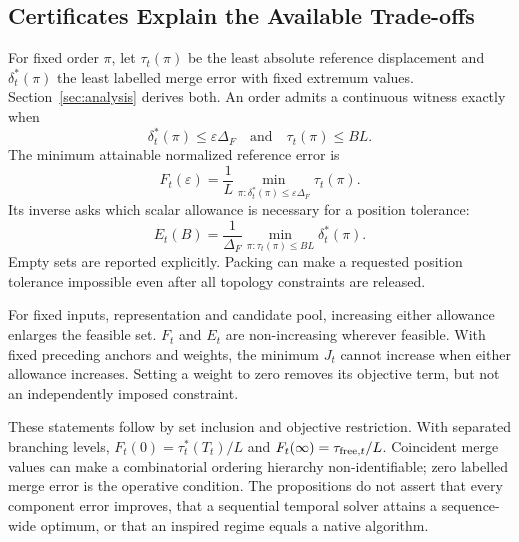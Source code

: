 \subsection{Certificates Explain the Available Trade-offs}
For fixed order $\pi$, let $\tau_t(\pi)$ be the least absolute reference displacement and $\delta_t^*(\pi)$ the least labelled merge error with fixed extremum values. Section~\ref{sec:analysis} derives both. An order admits a continuous witness exactly when
\[
 \delta_t^*(\pi)\le\varepsilon\Delta_F\quad\text{and}\quad\tau_t(\pi)\le BL.
\]
The minimum attainable normalized reference error is
\begin{equation}
 F_t(\varepsilon)=\frac1L\min_{\pi:\delta_t^*(\pi)\le\varepsilon\Delta_F}\tau_t(\pi).
 \label{eq:budget_frontier}
\end{equation}
Its inverse asks which scalar allowance is necessary for a position tolerance:
\begin{equation}
 E_t(B)=\frac1{\Delta_F}\min_{\pi:\tau_t(\pi)\le BL}\delta_t^*(\pi).
 \label{eq:inverse_budget}
\end{equation}
Empty sets are reported explicitly. Packing can make a requested position tolerance impossible even after all topology constraints are released.

\begin{proposition}
For fixed inputs, representation and candidate pool, increasing either allowance enlarges the feasible set. $F_t$ and $E_t$ are non-increasing wherever feasible. With fixed preceding anchors and weights, the minimum $J_t$ cannot increase when either allowance increases. Setting a weight to zero removes its objective term, but not an independently imposed constraint.
\end{proposition}
\noindent These statements follow by set inclusion and objective restriction. With separated branching levels, $F_t(0)=\tau_t^*(T_t)/L$ and $F_t(\infty)=\tau_{\mathrm{free},t}/L$. Coincident merge values can make a combinatorial ordering hierarchy non-identifiable; zero labelled merge error is the operative condition. The propositions do not assert that every component error improves, that a sequential temporal solver attains a sequence-wide optimum, or that an inspired regime equals a native algorithm.
